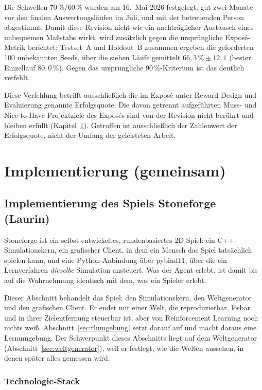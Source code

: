 \documentclass[11pt,a4paper]{article}
\let\sfOldSection\section
\renewcommand{\section}{\clearpage\sfOldSection}
\begin{document}
Die Schwellen 70\,\%/60\,\% wurden am 16.\ Mai 2026 festgelegt, gut zwei
Monate vor den finalen Auswertungsläufen im Juli, und mit der betreuenden
Person abgestimmt. Damit diese Revision nicht wie ein nachträglicher
Austausch eines unbequemen Maßstabs wirkt, wird zusätzlich gegen die
ursprüngliche Exposé-Metrik berichtet: Testset~A und Holdout~B zusammen
ergeben die geforderten 100 unbekannten Seeds, über die sieben Läufe
gemittelt $66{,}3\,\% \pm 12{,}1$ (bester Einzellauf $80{,}0\,\%$). Gegen das
ursprüngliche 90\,\%-Kriterium ist das deutlich verfehlt.

Diese Verfehlung betrifft ausschließlich die im Exposé unter \glqq Reward
Design und Evaluierung\grqq{} genannte Erfolgsquote. Die davon getrennt
aufgeführten Muss- und Nice-to-Have-Projektziele des Exposés sind von der
Revision nicht berührt und bleiben erfüllt (Kapitel~\ref{sec:implementierung}).
Getroffen ist ausschließlich der Zahlenwert der Erfolgsquote, nicht der
Umfang der geleisteten Arbeit.

\section{Implementierung (gemeinsam)}
\label{sec:implementierung}

\subsection{Implementierung des Spiels Stoneforge (Laurin)}
\label{sec:umgebung}

Stoneforge ist ein selbst entwickeltes, rundenbasiertes 2D-Spiel: ein
C++-Simulationskern, ein grafischer Client, in dem ein Mensch das Spiel
tatsächlich spielen kann, und eine Python-Anbindung über pybind11, über die ein
Lernverfahren \emph{dieselbe} Simulation ansteuert. Was der Agent erlebt, ist
damit bis auf die Wahrnehmung identisch mit dem, was ein Spieler erlebt.

Dieser Abschnitt behandelt das Spiel: den
Simulationskern, den Weltgenerator und den grafischen Client. Er endet mit
einer Welt, die reproduzierbar, lösbar und in ihrer Zielentfernung steuerbar
ist, aber von Reinforcement Learning noch nichts weiß.
Abschnitt~\ref{sec:rlumgebung} setzt darauf auf und macht daraus eine
Lernumgebung. Der Schwerpunkt dieses Abschnitts liegt auf dem Weltgenerator
(Abschnitt~\ref{sec:weltgenerator}), weil er festlegt, wie die Welten
aussehen, in denen später alles gemessen wird.

\subsubsection{Technologie-Stack}
\label{sec:technik}
\end{document}
